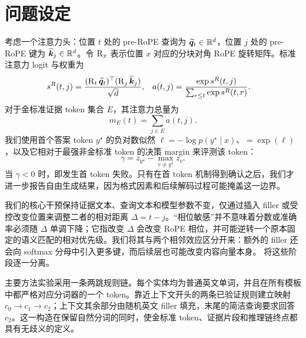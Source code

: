 \section{问题设定}
\label{sec:setup}

考虑一个注意力头：位置 $t$ 处的 pre-RoPE 查询为 $\widetilde{\bm q}_t\in\mathbb R^d$，位置 $j$ 处的 pre-RoPE 键为 $\widetilde{\bm k}_j\in\mathbb R^d$。令 $\operatorname{R}_x$ 表示位置 $x$ 对应的分块对角 RoPE 旋转矩阵。标准注意力 logit 与权重为
\begin{align}
  s^R(t,j)
  &= \frac{(\operatorname{R}_t\widetilde{\bm q}_t)^\top(\operatorname{R}_j\widetilde{\bm k}_j)}{\sqrt d},
  &
  a(t,j)
  &= \frac{\exp s^R(t,j)}{\sum_{r\le t}\exp s^R(t,r)}.
  \label{eq:standard-attn}
\end{align}
对于金标准证据 token 集合 $E$，其注意力总量为
\begin{equation}
  m_E(t)=\sum_{j\in E}a(t,j).
  \label{eq:evidence-mass}
\end{equation}
我们使用首个答案 token $y^\star$ 的负对数似然 $\ell=-\log p(y^\star\mid x)$、\GoldPPL $=\exp(\ell)$，以及它相对于最强非金标准 token 的决策 margin 来评测该 token：
\begin{equation}
  \gamma=z_{y^\star}-\max_{v\ne y^\star}z_v.
  \label{eq:margin}
\end{equation}
当 $\gamma<0$ 时，即发生首 token 失败。只有在首 token 机制得到确认之后，我们才进一步报告自由生成结果，因为格式因素和后续解码过程可能掩盖这一边界。

我们的核心干预保持证据文本、查询文本和模型参数不变，仅通过插入 filler 或受控改变位置来调整二者的相对距离 $\Delta=t-j$。“相位敏感”并不意味着分数或准确率必须随 $\Delta$ 单调下降；它指改变 $\Delta$ 会改变 RoPE 相位，并可能逆转一个原本固定的语义匹配的相对优先级。我们将其与两个相邻效应区分开来：额外的 filler 还会向 softmax 分母中引入更多键，而后续层也可能改变内容向量本身。 将这些阶段逐一分离。

主要方法实验采用一条两跳规则链。每个实体均为普通英文单词，并且在所有模板中都严格对应分词器的一个 token。靠近上下文开头的两条已验证规则建立映射 $c_0\rightarrow c_1\rightarrow c_2$；上下文其余部分由随机英文 filler 填充，末尾的简洁查询要求回答 $c_2$。这一构造在保留自然分词的同时，使金标准 token、证据片段和推理链终点都具有无歧义的定义。
